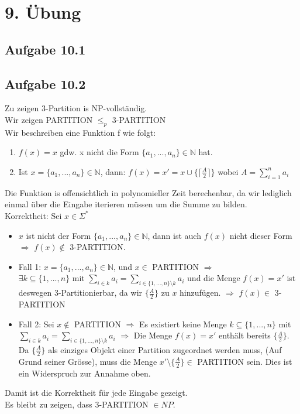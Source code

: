 \section*{9. Übung}
\subsection*{Aufgabe 10.1}


\newpage
\subsection*{Aufgabe 10.2}
Zu zeigen 3-Partition is NP-vollständig.\\

Wir zeigen PARTITION $\le_p$ 3-PARTITION\\

Wir beschreiben eine Funktion f wie folgt:

\begin{enumerate}
	\item $f(x) = x$ gdw. x nicht die Form $\{a_1, ..., a_n\} \in \mathbb{N}$ hat.
	\item Ist $x = \{a_1, ..., a_n\} \in \mathbb{N}$, dann: $f(x) = x' = x \cup \{\lceil\frac{A}{2}\rceil\}$ wobei $A = \sum_{i=1}^{n}{a_i}$
\end{enumerate}

Die Funktion is offensichtlich in polynomieller Zeit berechenbar, da wir lediglich einmal über die Eingabe iterieren müssen um 
die Summe zu bilden.\\

Korrektheit: Sei $x \in \Sigma^{*}$
\begin{itemize}
	\item $x$ ist nicht der Form $\{a_1,...,a_n\} \in \mathbb{N}$, dann ist auch $f(x)$ nicht dieser Form $\Rightarrow$ $f(x) \not\in $
		3-PARTITION.
	\item Fall 1: $x = \{a_1,...,a_n\} \in \mathbb{N}$, und $x \in $ PARTITION $\Rightarrow$\\
		 $\exists k \subseteq \{1,...,n\}$ mit $\sum_{i \in k} a_i = \sum_{i \in \{1,...,n\} \setminus k} a_i$ 
		 und die Menge $f(x) = x'$ ist deswegen 3-Partitionierbar, da wir
		$\{\frac{A}{2}\}$ zu $x$ hinzufügen. $\Rightarrow$ $f(x) \in$ 3-PARTITION
	\item Fall 2: Sei $x \not\in$ PARTITION $\Rightarrow$ Es existiert keine Menge $k \subseteq \{1,...,n\}$
		mit $\sum_{i \in k} a_i = \sum_{i \in \{1,...,n\} \setminus k} a_i$ $\Rightarrow$ Die Menge $f(x) = x'$ enthält bereits 
		$\{\frac{A}{2}\}$. Da $\{\frac{A}{2}\}$ als einziges Objekt einer Partition zugeordnet werden muss, (Auf Grund seiner Grösse),
		muss die Menge $x' \setminus \{\frac{A}{2}\} \in $ PARTITION sein. Dies ist ein Widerspruch zur Annahme oben.
\end{itemize}
Damit ist die Korrektheit für jede Eingabe gezeigt.\\
Es bleibt zu zeigen, dass 3-PARTITION $\in NP$.\\

